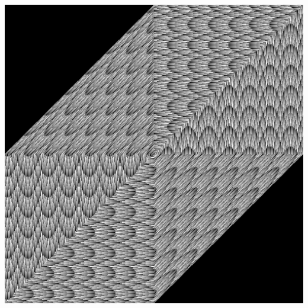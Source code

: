 \documentclass{beamer}
\theoremstyle{mydef}
\begin{document}
\frame
{
\begin{center}
  \includegraphics[scale=.24]{images/hex-sp-N73-k15.png}  
 \end{center}
  }
  
\end{document}
